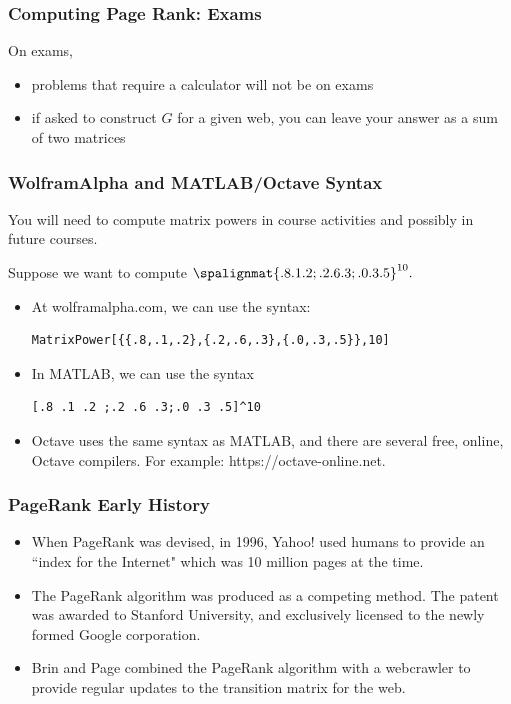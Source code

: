 \begin{frame}
\frametitle{Computing Page Rank: Exams}

On exams,
\begin{itemize} 
	\item problems that require a calculator will not be on exams
	\item if asked to construct $G$ for a given web, you can leave your answer as a sum of two matrices
\end{itemize}
    
\end{frame}



\begin{frame}[fragile=singleslide]
\frametitle{WolframAlpha and MATLAB/Octave Syntax}

    You will need to compute matrix powers in course activities and possibly in future courses.
    
    \vspace{12pt}
    
    Suppose we want to compute $
        \spalignmat{.8 .1 .2; .2 .6 .3; .0 .3 .5}^{10} .$
    
    \begin{itemize}
        \item At wolframalpha.com, we can use the syntax:
    {\small 
    \noindent \begin{verbatim}MatrixPower[{{.8,.1,.2},{.2,.6,.3},{.0,.3,.5}},10]\end{verbatim}}
    
        \item In MATLAB, we can use the syntax
    {\small 
    \noindent \begin{verbatim}[.8 .1 .2 ;.2 .6 .3;.0 .3 .5]^10\end{verbatim}}    
        \item Octave uses the same syntax as MATLAB, and there are several free, online, Octave compilers. For example: https://octave-online.net. 
    \end{itemize}

\end{frame}





\begin{frame}
\frametitle{PageRank Early History}


\begin{itemize}
    \item  When PageRank was devised, in 1996, Yahoo! used humans to provide an ``index for the Internet" which was 10 million pages at the time.
    \item  The PageRank algorithm was produced as a competing method.  The patent was awarded to Stanford University, and exclusively licensed to the newly formed Google corporation. 
    \item Brin and Page combined the PageRank algorithm with a webcrawler to provide regular updates to the transition matrix for the web.  
\end{itemize}



\end{frame}



